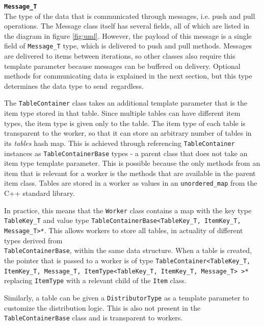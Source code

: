\documentclass{uit-report}
\begin{document}
\hspace{4ex} \textbf{\texttt{Message\_T}}
\\
The type of the data that is communicated through messages, i.e. push and pull operations. The Message class itself has several fields, all of which are listed in the diagram in figure \ref{fig:uml}. However, the payload of this message is a single field of \texttt{Message\_T} type, which is delivered to push and pull methods. Messages are delivered to items between iterations, so other classes also require this template parameter because messages can be buffered on delivery. Optional methods for communicating data is explained in the next section, but this type determines the data type to send~regardless.
  
The \texttt{TableContainer} class takes an additional template parameter that is the item type stored in that table. Since multiple tables can have different item types, the item type is given only to the table. The item type of each table is transparent to the worker, so that it can store an arbitrary number of tables in its \emph{tables} hash map. This is achieved through referencing \texttt{TableContainer} instances as \texttt{TableContainerBase} types - a parent class that does not take an item type template parameter. This is possible because the only methods from an item that is relevant for a worker is the methods that are available in the parent item class. Tables are stored in a worker as values in an \texttt{unordered\_map} from the C++ standard library.

In practice, this means that the \texttt{Worker} class contains a map with the key type 
\texttt{TableKey\_T} and value type \texttt{TableContainerBase<TableKey\_T, ItemKey\_T, Message\_T>*}. This allows workers to store all tables, in actuality of different types derived from\\ \texttt{TableContainerBase}, within the same data structure. When a table is created, the pointer that is passed to a worker is of type \texttt{TableContainer<TableKey\_T, ItemKey\_T, Message\_T, ItemType<TableKey\_T, ItemKey\_T, Message\_T> >*}\\ replacing \texttt{ItemType} with a relevant child of the \texttt{Item} class.

Similarly, a table can be given a \texttt{DistributorType} as a template parameter to customize the distribution logic. This is also not present in the \texttt{TableContainerBase} class and is transparent to workers.
\end{document}
